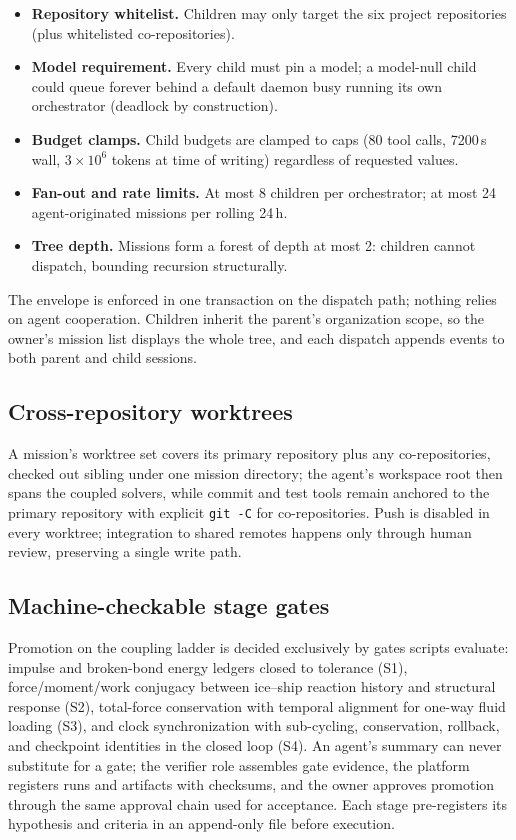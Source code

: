 \begin{itemize}
\item \textbf{Repository whitelist.} Children may only target the six
project repositories (plus whitelisted co-repositories).
\item \textbf{Model requirement.} Every child must pin a model; a
model-null child could queue forever behind a default daemon busy
running its own orchestrator (deadlock by construction).
\item \textbf{Budget clamps.} Child budgets are clamped to caps
(80 tool calls, 7200\,s wall, $3{\times}10^6$ tokens at time of
writing) regardless of requested values.
\item \textbf{Fan-out and rate limits.} At most 8 children per
orchestrator; at most 24 agent-originated missions per rolling 24\,h.
\item \textbf{Tree depth.} Missions form a forest of depth at most 2:
children cannot dispatch, bounding recursion structurally.
\end{itemize}

The envelope is enforced in one transaction on the dispatch path;
nothing relies on agent cooperation. Children inherit the parent's
organization scope, so the owner's mission list displays the whole tree,
and each dispatch appends events to both parent and child sessions.

\subsection{Cross-repository worktrees}
A mission's worktree set covers its primary repository plus any
co-repositories, checked out sibling under one mission directory; the
agent's workspace root then spans the coupled solvers, while commit and
test tools remain anchored to the primary repository with explicit
\texttt{git -C} for co-repositories. Push is disabled in every
worktree; integration to shared remotes happens only through human
review, preserving a single write path.

\subsection{Machine-checkable stage gates}
Promotion on the coupling ladder is decided exclusively by gates
scripts evaluate: impulse and broken-bond energy ledgers closed to
tolerance (S1), force/moment/work conjugacy between ice--ship reaction
history and structural response (S2), total-force conservation with
temporal alignment for one-way fluid loading (S3), and clock
synchronization with sub-cycling, conservation, rollback, and
checkpoint identities in the closed loop (S4). An agent's summary can
never substitute for a gate; the verifier role assembles gate evidence,
the platform registers runs and artifacts with checksums, and the owner
approves promotion through the same approval chain used for acceptance.
Each stage pre-registers its hypothesis and criteria in an append-only
file before execution.
